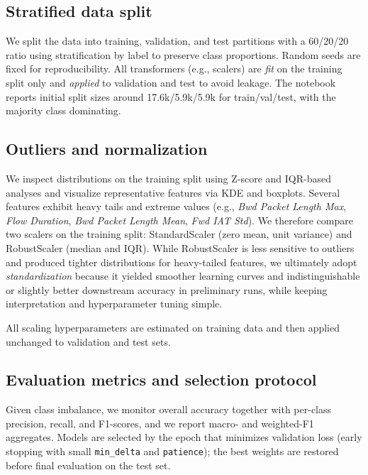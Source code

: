     \subsection{Stratified data split}

        We split the data into training, validation, and test partitions with a 60/20/20 ratio using stratification by label to preserve class proportions. 
        Random seeds are fixed for reproducibility. 
        All transformers (e.g., scalers) are \emph{fit} on the training split only and \emph{applied} to validation and test to avoid leakage. 
        The notebook reports initial split sizes around 17.6k/5.9k/5.9k for train/val/test, with the majority class dominating.

    \subsection{Outliers and normalization}

        We inspect distributions on the training split using Z-score and IQR-based analyses and visualize representative features via KDE and boxplots. 
        Several features exhibit heavy tails and extreme values (e.g., \textit{Bwd Packet Length Max}, \textit{Flow Duration}, \textit{Bwd Packet Length Mean}, \textit{Fwd IAT Std}). 
        We therefore compare two scalers on the training split: StandardScaler (zero mean, unit variance) and RobustScaler (median and IQR). 
        While RobustScaler is less sensitive to outliers and produced tighter distributions for heavy-tailed features, we ultimately adopt \emph{standardization} because it yielded smoother learning curves and indistinguishable or slightly better downstream accuracy in preliminary runs, while keeping interpretation and hyperparameter tuning simple.

        All scaling hyperparameters are estimated on training data and then applied unchanged to validation and test sets.

    \subsection{Evaluation metrics and selection protocol}

        Given class imbalance, we monitor overall accuracy together with per-class precision, recall, and F1-scores, and we report macro- and weighted-F1 aggregates. 
        Models are selected by the epoch that minimizes validation loss (early stopping with small \texttt{min\_delta} and \texttt{patience}); the best weights are restored before final evaluation on the test set.
